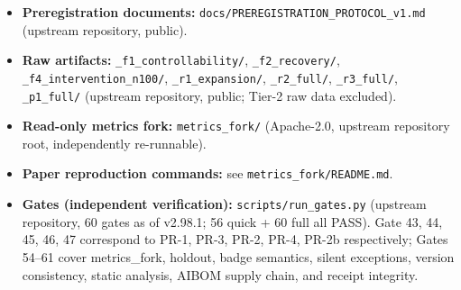 \documentclass[
]{article}
\providecommand{\tightlist}{%
  \setlength{\itemsep}{0pt}\setlength{\parskip}{0pt}}
\begin{document}
\begin{itemize}
\tightlist
\item
  \textbf{Preregistration documents:}
  \texttt{docs/PREREGISTRATION\_PROTOCOL\_v1.md} (upstream repository,
  public).
\item
  \textbf{Raw artifacts:} \texttt{\_f1\_controllability/},
  \texttt{\_f2\_recovery/}, \texttt{\_f4\_intervention\_n100/},
  \texttt{\_r1\_expansion/}, \texttt{\_r2\_full/}, \texttt{\_r3\_full/},
  \texttt{\_p1\_full/} (upstream repository, public; Tier-2 raw data
  excluded).
\item
  \textbf{Read-only metrics fork:} \texttt{metrics\_fork/} (Apache-2.0,
  upstream repository root, independently re-runnable).
\item
  \textbf{Paper reproduction commands:} see
  \texttt{metrics\_fork/README.md}.
\item
  \textbf{Gates (independent verification):}
  \texttt{scripts/run\_gates.py} (upstream repository, 60 gates as of
  v2.98.1; 56 quick + 60 full all PASS). Gate 43, 44, 45, 46, 47
  correspond to PR-1, PR-3, PR-2, PR-4, PR-2b respectively; Gates 54--61
  cover metrics\_fork, holdout, badge semantics, silent exceptions,
  version consistency, static analysis, AIBOM supply chain, and receipt
  integrity.
\end{itemize}


\end{document}
